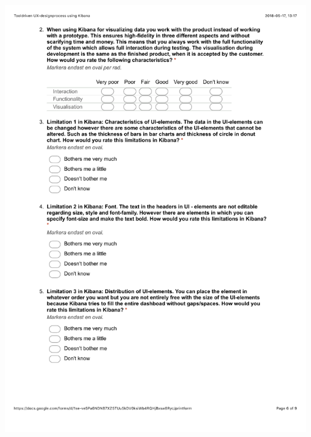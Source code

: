 \documentclass[12pt]{kththesis}
\begin{document}
\begin{appendices}
\includegraphics[width=1\textwidth]{UX_designprocess6.pdf}

\end{appendices}
\end{document}
